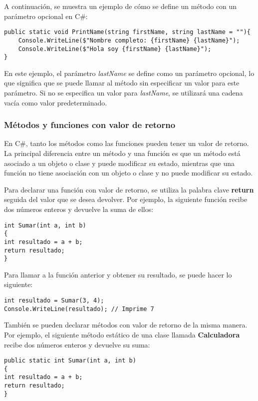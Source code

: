 \documentclass[executivepaper]{article}
\begin{document}
A continuación, se muestra un ejemplo de cómo se define un método con un parámetro opcional en C\#:

\begin{lstlisting}
public static void PrintName(string firstName, string lastName = ""){
    Console.WriteLine($"Nombre completo: {firstName} {lastName}");
    Console.WriteLine($"Hola soy {firstName} {lastName}");
}
\end{lstlisting}

En este ejemplo, el parámetro \emph{lastName} se define como un parámetro opcional, lo que significa que se puede llamar al método sin especificar un valor para este parámetro. Si no se especifica un valor para \emph{lastName}, se utilizará una cadena vacía como valor predeterminado.

\subsubsection*{Métodos y funciones con valor de retorno}

En C\#, tanto los métodos como las funciones pueden tener un valor de retorno. La principal diferencia entre un método y una función es que un método está asociado a un objeto o clase y puede modificar su estado, mientras que una función no tiene asociación con un objeto o clase y no puede modificar su estado.

Para declarar una función con valor de retorno, se utiliza la palabra clave \textbf{return} seguida del valor que se desea devolver. Por ejemplo, la siguiente función recibe dos números enteros y devuelve la suma de ellos:

\begin{lstlisting}[language={[Sharp]C}]
int Sumar(int a, int b)
{
int resultado = a + b;
return resultado;
}
\end{lstlisting}

Para llamar a la función anterior y obtener su resultado, se puede hacer lo siguiente:

\begin{lstlisting}[language={[Sharp]C}]
int resultado = Sumar(3, 4);
Console.WriteLine(resultado); // Imprime 7
\end{lstlisting}

También se pueden declarar métodos con valor de retorno de la misma manera. Por ejemplo, el siguiente método estático de una clase llamada \textbf{Calculadora} recibe dos números enteros y devuelve su suma:

\begin{lstlisting}[language={[Sharp]C}]
public static int Sumar(int a, int b)
{
int resultado = a + b;
return resultado;
}
\end{lstlisting}
\end{document}
